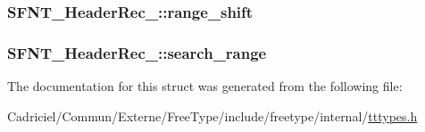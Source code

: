 \hypertarget{struct_s_f_n_t___header_rec___aa2a39db194a8a9a0cc8504143ac4f5c1}{
\subsubsection[{range\-\_\-shift}]{ S\-F\-N\-T\-\_\-\-Header\-Rec\-\_\-\-::range\-\_\-shift}}\label{struct_s_f_n_t___header_rec___aa2a39db194a8a9a0cc8504143ac4f5c1}
\hypertarget{struct_s_f_n_t___header_rec___a39ca0e21eaec6be602547bb2ed898d5d}{
\subsubsection[{search\-\_\-range}]{ S\-F\-N\-T\-\_\-\-Header\-Rec\-\_\-\-::search\-\_\-range}}\label{struct_s_f_n_t___header_rec___a39ca0e21eaec6be602547bb2ed898d5d}


The documentation for this struct was generated from the following file\-:\begin{DoxyCompactItemize}
\item 
Cadriciel/\-Commun/\-Externe/\-Free\-Type/include/freetype/internal/\hyperlink{tttypes_8h}{tttypes.\-h}\end{DoxyCompactItemize}
